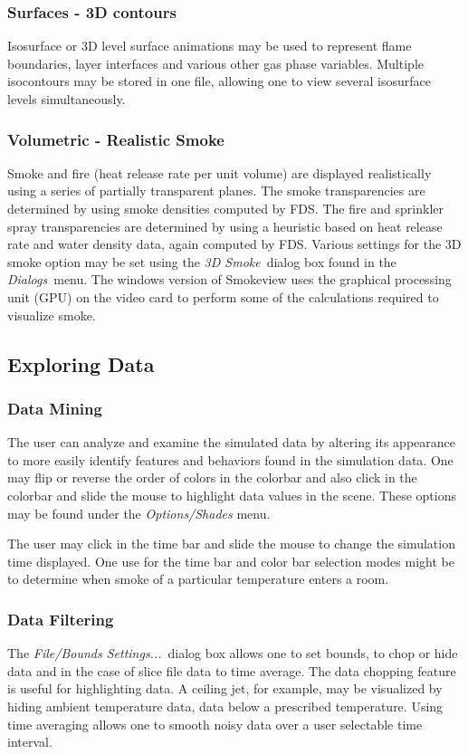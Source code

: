 \documentclass[11pt,twoside]{book}
\begin{document}
\subsubsection{Surfaces - 3D contours}
Isosurface or 3D level surface
animations may be used to represent flame boundaries, layer
interfaces and various other gas phase variables. Multiple
isocontours may be stored in one file, allowing one to
view several isosurface levels simultaneously.

\subsubsection{Volumetric - Realistic Smoke}
Smoke and fire (heat release rate per unit volume) are displayed
realistically using a series of partially transparent planes.  The
smoke transparencies are determined by using smoke densities
computed by FDS.  The fire and sprinkler spray transparencies are
determined by using a heuristic based on heat release rate and
water density data, again computed by FDS. Various settings for
the 3D smoke option may be set using the {\em 3D Smoke}\ dialog
box found in the {\em Dialogs}\ menu.  The windows version of
Smokeview uses the graphical processing unit (GPU) on the video
card to perform some of the calculations required to visualize
smoke.

\subsection{Exploring Data}

\subsubsection{Data Mining} The user can analyze and examine the simulated
data by altering its appearance to more easily identify features
and behaviors found in the simulation data. One may flip or
reverse the order of colors in the colorbar and also click in the
colorbar and slide the mouse to highlight data values in the
scene. These options may be found under the {\em Options/Shades}
menu.

The user may click in the time bar and slide the mouse to
change the simulation time displayed. One use for the time
bar and color bar selection modes might be to determine
when smoke of a particular temperature enters a room.

\subsubsection{Data Filtering} The {\em File/Bounds Settings...}\
dialog box allows one to set bounds, to chop or hide data and in the case
of slice file data to time average. The data chopping
feature is useful for highlighting data.  A ceiling jet, for example,
may be visualized by hiding ambient temperature
data,  data below a prescribed temperature.
Using time averaging allows one to smooth noisy data over a user selectable time
interval.
\end{document}
